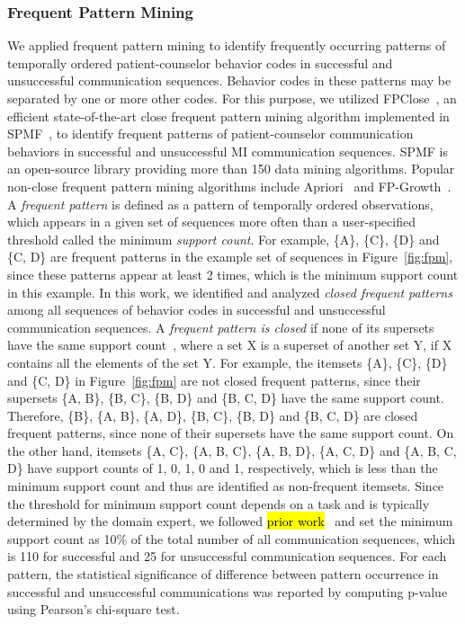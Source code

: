 \subsubsection{Frequent Pattern Mining}
\label{subsubsec:frequentPatternMining}
We applied frequent pattern mining to identify frequently occurring patterns of temporally ordered patient-counselor behavior codes in successful and unsuccessful communication sequences. Behavior codes in these patterns may be separated by one or more other codes. For this purpose, we utilized FPClose~\cite{grahne2005fast}, an efficient state-of-the-art close frequent pattern mining algorithm implemented in SPMF~\cite{fournier2014spmf, fournier2016spmf}, to identify frequent patterns of patient-counselor communication behaviors in successful and unsuccessful MI communication sequences. SPMF is an open-source library providing more than 150 data mining algorithms. Popular non-close frequent pattern mining algorithms include Apriori~\cite{agrawal1994fast} and FP-Growth~\cite{han2000mining}. A \textit{frequent pattern} is defined as a pattern of temporally ordered observations, which appears in a given set of sequences more often than a user-specified threshold called the minimum \textit{support count}. For example, \{A\}, \{C\}, \{D\} and \{C, D\} are frequent patterns in the example set of sequences in Figure~\ref{fig:fpm}, since these patterns appear at least 2 times, which is the minimum support count in this example. In this work, we identified and analyzed \textit{closed frequent patterns} among all sequences of behavior codes in successful and unsuccessful communication sequences. A \textit{frequent pattern is closed} if none of its supersets have the same support count~\cite{pasquier1999discovering}, where a set X is a superset of another set Y, if X contains all the elements of the set Y. For example, the itemsets \{A\}, \{C\}, \{D\} and \{C, D\} in Figure~\ref{fig:fpm} are not closed frequent patterns, since their supersets \{A, B\}, \{B, C\}, \{B, D\} and \{B, C, D\} have the same support count. Therefore, \{B\}, \{A, B\}, \{A, D\}, \{B, C\}, \{B, D\} and \{B, C, D\} are closed frequent patterns, since none of their supersets have the same support count. On the other hand, itemsets \{A, C\}, \{A, B, C\}, \{A, B, D\}, \{A, C, D\} and \{A, B, C, D\} have support counts of 1, 0, 1, 0 and 1, respectively, which is less than the minimum support count and thus are identified as non-frequent itemsets. Since the threshold for minimum support count depends on a task and is typically determined by the domain expert, we followed \hl{prior work}~\cite{moradi2017quantifying, liu1999mining} and set the minimum support count as 10\% of the total number of all communication sequences, which is 110 for successful and 25 for unsuccessful communication sequences. For each pattern, the statistical significance of difference between pattern occurrence in successful and unsuccessful communications was reported by computing p-value using Pearson's chi-square test.  

